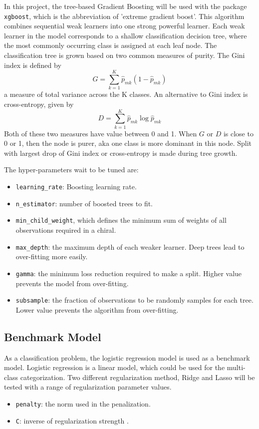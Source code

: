 \documentclass[12pt]{article}
\begin{document}
In this project, the tree-based Gradient Boosting will be used with the package \verb|xgboost|, which is the abbreviation of 'extreme gradient boost'. This algorithm combines sequential weak learners into one strong powerful learner. Each weak learner in the model corresponds to a shallow classification decision tree, where the most commonly occurring class is assigned at each leaf node.
The classification tree is grown based on two common measures of purity. 
The Gini index is defined by 
\begin{equation}
G = \sum_{k=1}^K\hat{p}_{mk}(1-\hat{p}_{mk})
\end{equation}
a measure of total variance across the K classes.
An alternative to Gini index is cross-entropy, given by
\begin{equation}
D = \sum_{k=1}^K\hat{p}_{mk}\log\hat{p}_{mk}
\end{equation}
Both of these two measures have value between 0 and 1. When $G$ or $D$ is close to 0 or 1, then the node is purer, aka one class is more dominant in this node. Split with largest drop of Gini index or cross-entropy is made during tree growth.

The hyper-parameters wait to be tuned are:

\begin{itemize}
\item \verb|learning_rate|: Boosting learning rate.
\item \verb|n_estimator|: number of boosted trees to fit.
\item \verb|min_child_weight|, which defines the minimum sum of weights of all observations required in a chiral.
\item \verb|max_depth|: the maximum depth of each weaker learner. Deep trees lead to over-fitting more easily.
\item \verb|gamma|: the minimum loss reduction required to make a split. Higher value prevents the model from over-fitting.
\item \verb|subsample|: the fraction of observations to be randomly samples for each tree. Lower value prevents the algorithm from over-fitting.
\end{itemize}


\subsection{Benchmark Model}
As a classification problem, the logistic regression model is used as a benchmark model. Logistic regression is a linear model, which could be used for the multi-class categorization. Two different regularization method, Ridge and Lasso will be tested with a range of regularization parameter values.
\begin{itemize}
\item \verb|penalty|: the norm used in the penalization.
\item \verb|C|: inverse of regularization strength .
\end{itemize}
\end{document}
